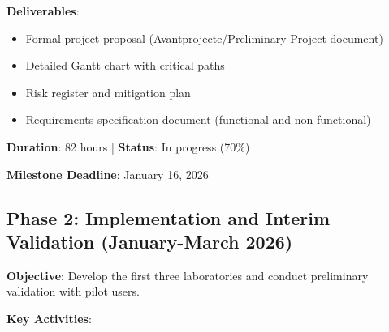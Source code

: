 \textbf{Deliverables}:
\begin{itemize}
\item Formal project proposal (Avantprojecte/Preliminary Project document)
\item Detailed Gantt chart with critical paths
\item Risk register and mitigation plan
\item Requirements specification document (functional and non-functional)
\end{itemize}

\textbf{Duration}: 82 hours | \textbf{Status}: In progress (70\%)

\textbf{Milestone Deadline}: January 16, 2026

\subsection{Phase 2: Implementation and Interim Validation (January-March 2026)}

\textbf{Objective}: Develop the first three laboratories and conduct preliminary validation with pilot users.

\textbf{Key Activities}:

